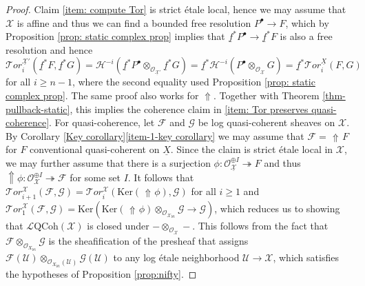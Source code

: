 \documentclass[11pt]{amsart}
\theoremstyle{definition}
\theoremstyle{definition}
\DeclareMathOperator{\arrowup}{\!\Uparrow \!}
\newcommand{\cF}{\mathcal{F}}
\newcommand{\cG}{\mathcal{G}}
\newcommand{\cL}{\mathcal{L}}
\newcommand{\cO}{\mathcal{O}}
\newcommand{\cT}{\mathcal{T}}
\newcommand{\cU}{\mathcal{U}}
\newcommand{\cX}{\mathcal{X}}
\newcommand{\LogO}[1]{\mathcal{O}_{{#1}_\text{l\'et}}}
\newcommand{\cal}{\mathcal}
\def\cF{{\cal F}}
\def\cL{{\cal L}}
\def\cO{{\cal O}}
\def\cT{{\cal T}}
\def\cU{{\cal U}}
\def\cX{{\cal X}}
\newcommand{\logqcoh}[1]{\cL \text{QCoh}(#1)}
\begin{document}
\begin{proof}
    Claim \eqref{item: compute Tor} is strict \'etale local, hence we may assume that $\mathcal{X}$ is affine and thus we can find a bounded free resolution $P^\bullet\rightarrow F$, which by Proposition \ref{prop: static complex prop} implies that $\underline{f}^*P^{\bullet}\rightarrow\underline{f}^*F$ is also a free resolution and hence $$\mathcal{T}or_i^{\underline{\mathcal{X}}'}(\underline{f}^* F,\underline{f}^* G) = \mathcal{H}^{-i}(\underline{f}^*P^\bullet\otimes_{\mathcal{O}_{\underline{\mathcal{X}}'}}\underline{f}^*G) = \underline{f}^*\mathcal{H}^{-i}(P^\bullet\otimes_{\mathcal{O}_{\underline{\mathcal{X}}}}G) = \underline{f}^*\mathcal{T}or_i^{\underline{X}}(F,G)$$ for all $i\geq n-1$, where the second equality used Proposition \ref{prop: static complex prop}. The same proof also works for $\Uparrow$. Together with Theorem \ref{thm-pullback-static}, this implies the coherence claim in \eqref{item: Tor preserves quasi-coherence}. For quasi-coherence, let $\mathcal{F}$ and $\mathcal{G}$ be log quasi-coherent sheaves on $\cX$. By Corollary \ref{Key corollary}\eqref{item-1-key corollary} we may assume that $\mathcal{F} = \arrowup F$ for $F$ conventional quasi-coherent on $\underline{X}$. Since the claim is strict \'etale local in $\mathcal{X}$, we may further assume that there is a surjection $\phi\colon \cO_{\underline{\cX}}^{\oplus I}\twoheadrightarrow F$ and thus $\Uparrow\!\!\phi\colon\mathcal{O}_\cX^{\oplus I}\twoheadrightarrow \mathcal{F}$ for some set $I$. It follows that $\cT or_{i+1}^\cX(\cF,\cG) = \cT or_{i}^\cX(\text{Ker}(\arrowup\phi),\cG)$ for all $i\geq 1$ and $\cT or_{1}^\cX(\cF,\cG) = \text{Ker}(\text{Ker}(\arrowup\phi)\otimes_{\LogO{\cX}}\cG\rightarrow \cG)$, which reduces us to showing that $\logqcoh{\mathcal{X}}$ is closed under $-\otimes_{\cO_\cX}-$. This follows from the fact that $\cF\otimes_{\LogO{X}}\cG$ is the sheafification of the presheaf that assigns $\cF(\cU)\otimes_{\LogO{X}(\cU)}\cG(\cU)$ to any log \'etale neighborhood $\cU\rightarrow \cX$, which satisfies the hypotheses of Proposition \ref{prop:nifty}.
\end{proof}
\end{document}
